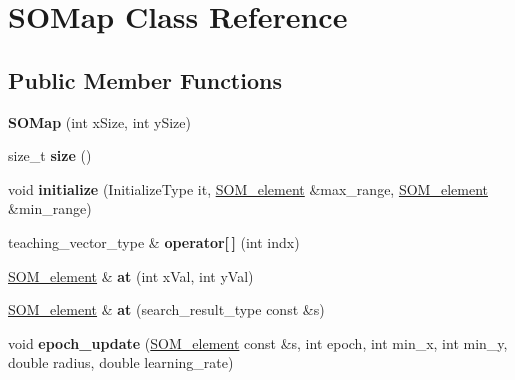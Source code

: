 \hypertarget{classSOMap}{}\section{S\+O\+Map Class Reference}
\label{classSOMap}
\subsection*{Public Member Functions}
\begin{DoxyCompactItemize}
\item 
\hypertarget{classSOMap_a217025f49090ae46420dd7639fb641f5}{}{\bfseries S\+O\+Map} (int x\+Size, int y\+Size)\label{classSOMap_a217025f49090ae46420dd7639fb641f5}

\item 
\hypertarget{classSOMap_af77942b9164afaca599c67dcf9b0084f}{}size\+\_\+t {\bfseries size} ()\label{classSOMap_af77942b9164afaca599c67dcf9b0084f}

\item 
\hypertarget{classSOMap_a19c3e6a13586e146ca859eea5f9fda08}{}void {\bfseries initialize} (Initialize\+Type it, \hyperlink{classSOM__element}{S\+O\+M\+\_\+element} \&max\+\_\+range, \hyperlink{classSOM__element}{S\+O\+M\+\_\+element} \&min\+\_\+range)\label{classSOMap_a19c3e6a13586e146ca859eea5f9fda08}

\item 
\hypertarget{classSOMap_aa2bd118c7bc3f68853e7ad79747a479d}{}teaching\+\_\+vector\+\_\+type \& {\bfseries operator\mbox{[}$\,$\mbox{]}} (int indx)\label{classSOMap_aa2bd118c7bc3f68853e7ad79747a479d}

\item 
\hypertarget{classSOMap_a3c1d8407353e01d485dda3d09dae61db}{}\hyperlink{classSOM__element}{S\+O\+M\+\_\+element} \& {\bfseries at} (int x\+Val, int y\+Val)\label{classSOMap_a3c1d8407353e01d485dda3d09dae61db}

\item 
\hypertarget{classSOMap_a34937975cb49b4b71bdb4fdc64f59e9f}{}\hyperlink{classSOM__element}{S\+O\+M\+\_\+element} \& {\bfseries at} (search\+\_\+result\+\_\+type const \&s)\label{classSOMap_a34937975cb49b4b71bdb4fdc64f59e9f}

\item 
\hypertarget{classSOMap_a8a7acff305596d58524faa4404424bb2}{}void {\bfseries epoch\+\_\+update} (\hyperlink{classSOM__element}{S\+O\+M\+\_\+element} const \&s, int epoch, int min\+\_\+x, int min\+\_\+y, double radius, double learning\+\_\+rate)\label{classSOMap_a8a7acff305596d58524faa4404424bb2}


\end{DoxyCompactItemize}
